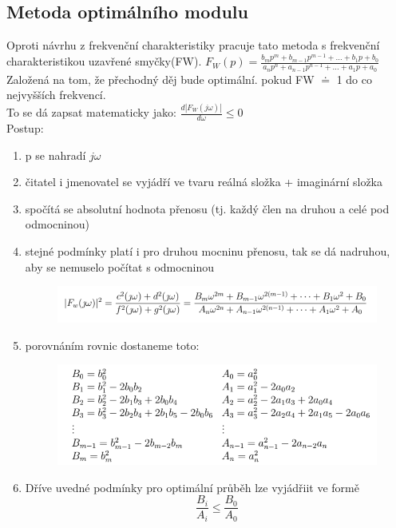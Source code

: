\subsection*{Metoda optimálního modulu}
Oproti návrhu z frekvenční charakteristiky pracuje tato metoda s frekvenční charakteristikou uzavřené smyčky(FW). $F_W(p) = \frac{b_mp^m+b_{m-1}p^{m-1}+\dots + b_1p+b_0}{a_np^n+a_{n-1}p^{n-1}+\dots + a_1p+a_0}$\\
Založená na tom, že přechodný děj bude optimální. pokud FW $\doteq$ 1 do co nejvyšších frekvencí.\\
To se dá zapsat matematicky jako: $\frac{d|F_W(j\omega) |}{d\omega} \leq 0$\\
Postup:
\begin{enumerate}
    \item p se nahradí $j\omega$
    \item čitatel i jmenovatel se vyjádří ve tvaru reálná složka + imaginární složka
    \item spočítá se absolutní hodnota přenosu (tj. každý člen na druhou a celé pod odmocninou)
    \item stejné podmínky platí i pro druhou mocninu přenosu, tak se dá nadruhou, aby se nemuselo počítat s odmocninou
          \begin{figure}[H]
              \includegraphics*[scale = 1.0]{images/optimalniModul1.png}
          \end{figure}
    \item porovnáním rovnic dostaneme toto:
          \begin{figure}[H]
              \includegraphics*[scale = 1.0]{images/optimalniModul2.png}
          \end{figure}
    \item Dříve uvedné podmínky pro optimální průběh lze vyjádřiit ve formě
          \begin{equation}
              \frac{B_i}{A_i} \leq \frac{B_0}{A_0}
          \end{equation}
\end{enumerate}


